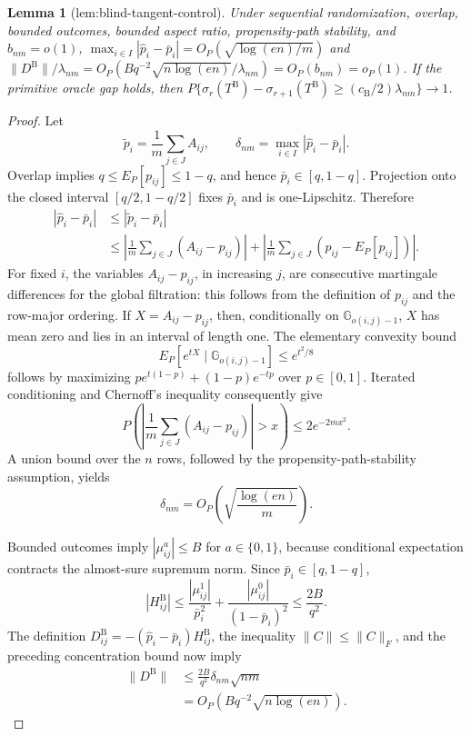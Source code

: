 \documentclass{article}
\newtheorem{lemma}{Lemma}
\begin{document}
\begin{lemma}[lem:blind-tangent-control]\label{lem:blind-tangent-control}
Under sequential randomization, overlap, bounded outcomes, bounded aspect ratio, propensity-path stability, and \(b_{nm}=o(1)\), \(\max_{i\in I}|\widehat p_i-\bar p_i|=O_P(\sqrt{\log(en)/m})\) and \(\lVert D^{\mathrm B}\rVert/\lambda_{nm}=O_P(Bq^{-2}\sqrt{n\log(en)}/\lambda_{nm})=O_P(b_{nm})=o_P(1)\). If the primitive oracle gap holds, then \(P\{\sigma_r(T^{\mathrm B})-\sigma_{r+1}(T^{\mathrm B})\ge(c_{\mathrm B}/2)\lambda_{nm}\}\to1\).
\end{lemma}
\begin{proof}
Let
\[
 \widetilde p_i=\frac1m\sum_{j\in J}A_{ij},\qquad
 \delta_{nm}=\max_{i\in I}|\widehat p_i-\bar p_i|.
\]
Overlap implies \(q\le E_P[p_{ij}]\le1-q\), and hence \(\bar p_i\in[q,1-q]\).  Projection onto the closed interval \([q/2,1-q/2]\) fixes \(\bar p_i\) and is one-Lipschitz.  Therefore
\[
 \begin{aligned}
 |\widehat p_i-\bar p_i|
 &\le |\widetilde p_i-\bar p_i|\\
 &\le \left|\frac1m\sum_{j\in J}(A_{ij}-p_{ij})\right|
 +\left|\frac1m\sum_{j\in J}(p_{ij}-E_P[p_{ij}])\right|.
 \end{aligned}
\]
For fixed \(i\), the variables \(A_{ij}-p_{ij}\), in increasing \(j\), are consecutive martingale differences for the global filtration: this follows from the definition of \(p_{ij}\) and the row-major ordering.  If \(X=A_{ij}-p_{ij}\), then, conditionally on \(\mathbb G_{o(i,j)-1}\), \(X\) has mean zero and lies in an interval of length one.  The elementary convexity bound
\[
 E_P[e^{tX}\mid\mathbb G_{o(i,j)-1}]\le e^{t^2/8}
\]
follows by maximizing \(p e^{t(1-p)}+(1-p)e^{-tp}\) over \(p\in[0,1]\).  Iterated conditioning and Chernoff's inequality consequently give
\[
 P\!\left(\left|\frac1m\sum_{j\in J}(A_{ij}-p_{ij})\right|>x\right)
 \le 2e^{-2mx^2}.
\]
A union bound over the \(n\) rows, followed by the propensity-path-stability assumption, yields
\[
 \delta_{nm}=O_P\!\left(\sqrt{\frac{\log(en)}m}\right).
\]

Bounded outcomes imply \(|\mu^a_{ij}|\le B\) for \(a\in\{0,1\}\), because conditional expectation contracts the almost-sure supremum norm.  Since \(\bar p_i\in[q,1-q]\),
\[
 |H^{\mathrm B}_{ij}|
 \le \frac{|\mu^1_{ij}|}{\bar p_i^2}
      +\frac{|\mu^0_{ij}|}{(1-\bar p_i)^2}
 \le \frac{2B}{q^2}.
\]
The definition \(D^{\mathrm B}_{ij}=-(\widehat p_i-\bar p_i)H^{\mathrm B}_{ij}\), the inequality \(\lVert C\rVert\le\lVert C\rVert_F\), and the preceding concentration bound now imply
\[
 \begin{aligned}
 \lVert D^{\mathrm B}\rVert
 &\le \frac{2B}{q^2}\delta_{nm}\sqrt{nm}\\
 &=O_P\!\left(Bq^{-2}\sqrt{n\log(en)}\right).
 \end{aligned}
\]


\end{proof}
\end{document}
